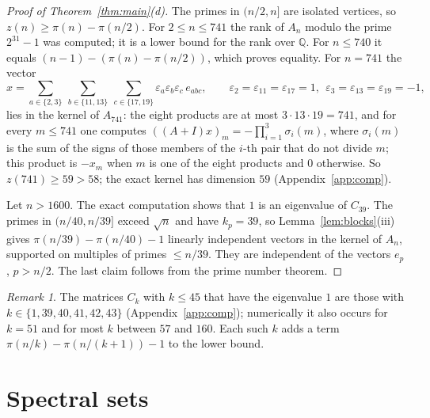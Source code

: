 \documentclass[11pt]{amsart}
\theoremstyle{definition}
\theoremstyle{remark}
\newtheorem{remark}[theorem]{Remark}
\begin{document}
\begin{proof}[Proof of Theorem~\ref{thm:main}(d)]
The primes in $(n/2,n]$ are isolated vertices, so $z(n)\ge\pi(n)-\pi(n/2)$. For $2\le n\le741$ the rank of $A_n$ modulo the prime $2^{31}-1$ was computed; it is a lower bound for the rank over $\mathbb Q$. For $n\le740$ it equals $(n-1)-(\pi(n)-\pi(n/2))$, which proves equality. For $n=741$ the vector
\[
x=\sum_{a\in\{2,3\}}\ \sum_{b\in\{11,13\}}\ \sum_{c\in\{17,19\}}\varepsilon_a\varepsilon_b\varepsilon_c\,e_{abc},\qquad \varepsilon_2=\varepsilon_{11}=\varepsilon_{17}=1,\ \ \varepsilon_3=\varepsilon_{13}=\varepsilon_{19}=-1,
\]
lies in the kernel of $A_{741}$: the eight products are at most $3\cdot13\cdot19=741$, and for every $m\le741$ one computes $((A+I)x)_m=-\prod_{i=1}^{3}\sigma_i(m)$, where $\sigma_i(m)$ is the sum of the signs of those members of the $i$-th pair that do not divide $m$; this product is $-x_m$ when $m$ is one of the eight products and $0$ otherwise. So $z(741)\ge59>58$; the exact kernel has dimension $59$ (Appendix~\ref{app:comp}).

Let $n>1600$. The exact computation shows that $1$ is an eigenvalue of $C_{39}$. The primes in $(n/40,n/39]$ exceed $\sqrt n$ and have $k_p=39$, so Lemma~\ref{lem:blocks}(iii) gives $\pi(n/39)-\pi(n/40)-1$ linearly independent vectors in the kernel of $A_n$, supported on multiples of primes $\le n/39$. They are independent of the vectors $e_p$, $p>n/2$. The last claim follows from the prime number theorem.
\end{proof}

\begin{remark}
The matrices $C_k$ with $k\le45$ that have the eigenvalue $1$ are those with $k\in\{1,39,40,41,42,43\}$ (Appendix~\ref{app:comp}); numerically it also occurs for $k=51$ and for most $k$ between $57$ and $160$. Each such $k$ adds a term $\pi(n/k)-\pi(n/(k+1))-1$ to the lower bound.
\end{remark}

\section{Spectral sets}
\end{document}
